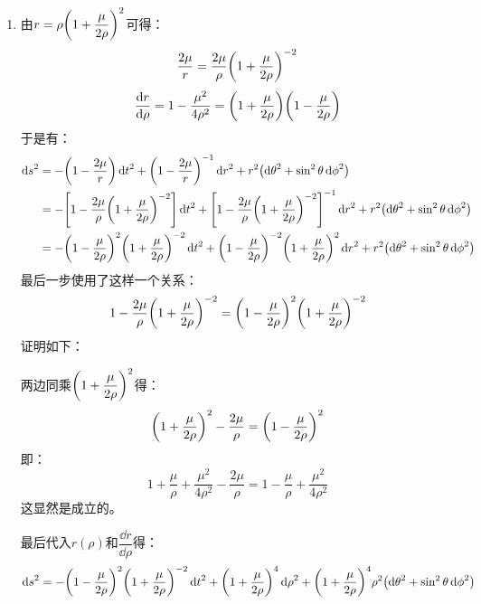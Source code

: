 \documentclass[a4paper]{article}
\begin{document}
\begin{enumerate}
    \item[3.]
    由$r = \rho \qty(1 + \dfrac{\mu}{2\rho})^2$可得：
    \[
        \frac{2\mu}{r} = \frac{2\mu}{\rho} \qty(1 + \frac{\mu}{2\rho})^{-2}
    \]
    \[
        \dv{r}{\rho} = 1 - \frac{\mu^2}{4\rho^2} = \qty(1 + \frac{\mu}{2\rho}) \qty(1 - \frac{\mu}{2\rho})
    \]
    于是有：
    \begin{align*}
        \dd{s}^2
        &= -\qty(1 - \frac{2\mu}{r}) \dd{t}^2 + \qty(1 - \frac{2\mu}{r})^{-1} \dd{r}^2 + r^2 \qty(\dd{\theta}^2 + \sin^2\theta \dd{\phi}^2) \\
        &= -\qty[1 - \frac{2\mu}{\rho} \qty(1 + \frac{\mu}{2\rho})^{-2}] \dd{t}^2 + \qty[1 - \frac{2\mu}{\rho} \qty(1 + \frac{\mu}{2\rho})^{-2}]^{-1} \dd{r}^2 + r^2 \qty(\dd{\theta}^2 + \sin^2\theta \dd{\phi}^2) \\
        &= -\qty(1 - \frac{\mu}{2\rho})^2 \qty(1 + \frac{\mu}{2\rho})^{-2} \dd{t}^2 + \qty(1 - \frac{\mu}{2\rho})^{-2} \qty(1 + \frac{\mu}{2\rho})^2 \dd{r}^2 + r^2 \qty(\dd{\theta}^2 + \sin^2\theta \dd{\phi}^2)
    \end{align*}
    最后一步使用了这样一个关系：
    \[
        1 - \frac{2\mu}{\rho} \qty(1 + \frac{\mu}{2\rho})^{-2} = \qty(1 - \frac{\mu}{2\rho})^2 \qty(1 + \frac{\mu}{2\rho})^{-2}
    \]
    证明如下：

    两边同乘$\qty(1 + \dfrac{\mu}{2\rho})^2$得：
    \[
        \qty(1 + \frac{\mu}{2\rho})^2 - \frac{2\mu}{\rho} = \qty(1 - \frac{\mu}{2\rho})^2
    \]
    即：
    \[
        1 + \frac{\mu}{\rho} + \frac{\mu^2}{4\rho^2} - \frac{2\mu}{\rho} = 1 - \frac{\mu}{\rho} + \frac{\mu^2}{4\rho^2}
    \]
    这显然是成立的。

    最后代入$r(\rho)$和$\dfrac{\dd{r}}{\dd{\rho}}$得：
    \[
        \dd{s}^2 = -\qty(1 - \frac{\mu}{2\rho})^2 \qty(1 + \frac{\mu}{2\rho})^{-2} \dd{t}^2 + \qty(1 + \frac{\mu}{2\rho})^4 \dd{\rho}^2 + \qty(1 + \frac{\mu}{2\rho})^4 \rho^2 \qty(\dd{\theta}^2 + \sin^2\theta \dd{\phi}^2)
    \]
\end{enumerate}
\end{document}
